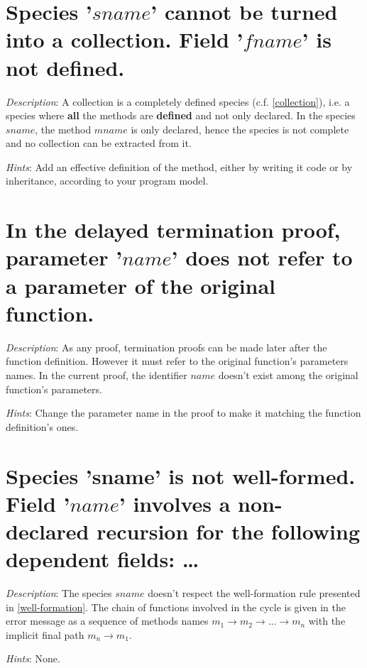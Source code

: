 \section*{Species '$sname$' cannot be turned into a collection. Field
  '$fname$' is not defined.}

{\em Description}: A collection is a completely defined species
(c.f. \ref{collection}), i.e. a species where {\bf all} the methods
are {\bf defined} and not only declared. In the species $sname$, the
method $mname$ is only declared, hence the species is not complete and
no collection can be extracted from it.

{\em Hints}: Add an effective definition of the method, either by
writing it code or by inheritance, according to your program model.



\section*{In the delayed termination proof, parameter '$name$' does
  not refer to a parameter of the original function.}

{\em Description}: As any proof, termination proofs can be made later
after the function definition. However it must refer to the original
function's parameters names. In the current proof, the identifier
$name$ doesn't exist among the original function's parameters.

{\em Hints}: Change the parameter name in the proof to make it
matching the function definition's ones.



\section*{Species 'sname' is not well-formed. Field '$name$' involves
  a non-declared recursion for the following dependent fields: \ldots}

{\em Description}: The species $sname$ doesn't respect the
well-formation rule presented in \ref{well-formation}. The chain of
functions involved in the cycle is given in the error message as a
sequence of methods names
$m_1 \rightarrow m_2 \rightarrow \ldots \rightarrow m_n$ with the
implicit final path $m_n \rightarrow m_1$.

{\em Hints}: None.



